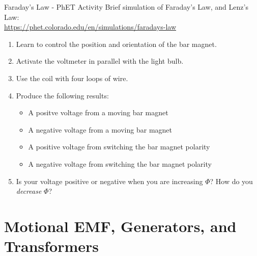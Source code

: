 \documentclass{beamer}
\begin{document}
\begin{frame}{Faraday's Law - PhET Activity}
\small
Brief simulation of Faraday's Law, and Lenz's Law: \\ \vspace{0.5cm}
\footnotesize
\url{https://phet.colorado.edu/en/simulations/faradays-law}
\small
\begin{enumerate}
\item Learn to control the position and orientation of the bar magnet.
\item Activate the voltmeter in parallel with the light bulb.
\item Use the coil with four loops of wire.
\item Produce the following results:
\begin{itemize}
\item A positve voltage from a moving bar magnet
\item A negative voltage from a moving bar magnet
\item A positive voltage from switching the bar magnet polarity
\item A negative voltage from switching the bar magnet polarity
\end{itemize}
\item Is your voltage positive or negative when you are increasing $\Phi$?  How do you \textit{decrease} $\Phi$?
\end{enumerate}
\end{frame}

\section{Motional EMF, Generators, and Transformers}
\end{document}
